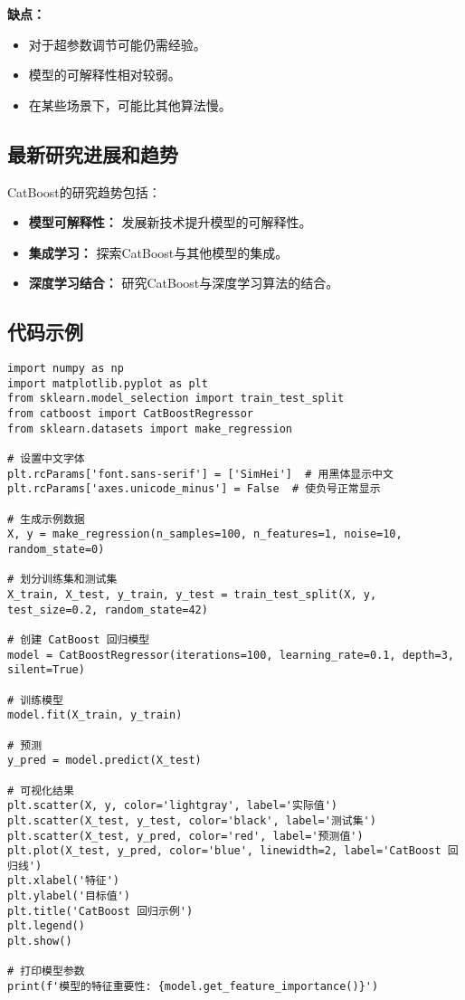 \textbf{缺点：}
\begin{itemize}
    \item 对于超参数调节可能仍需经验。
    \item 模型的可解释性相对较弱。
    \item 在某些场景下，可能比其他算法慢。
\end{itemize}

\subsection*{最新研究进展和趋势}
CatBoost的研究趋势包括：
\begin{itemize}
    \item \textbf{模型可解释性：} 发展新技术提升模型的可解释性。
    \item \textbf{集成学习：} 探索CatBoost与其他模型的集成。
    \item \textbf{深度学习结合：} 研究CatBoost与深度学习算法的结合。
\end{itemize}
\subsection*{代码示例}
\begin{lstlisting}
import numpy as np
import matplotlib.pyplot as plt
from sklearn.model_selection import train_test_split
from catboost import CatBoostRegressor
from sklearn.datasets import make_regression

# 设置中文字体
plt.rcParams['font.sans-serif'] = ['SimHei']  # 用黑体显示中文
plt.rcParams['axes.unicode_minus'] = False  # 使负号正常显示

# 生成示例数据
X, y = make_regression(n_samples=100, n_features=1, noise=10, random_state=0)

# 划分训练集和测试集
X_train, X_test, y_train, y_test = train_test_split(X, y, test_size=0.2, random_state=42)

# 创建 CatBoost 回归模型
model = CatBoostRegressor(iterations=100, learning_rate=0.1, depth=3, silent=True)

# 训练模型
model.fit(X_train, y_train)

# 预测
y_pred = model.predict(X_test)

# 可视化结果
plt.scatter(X, y, color='lightgray', label='实际值')
plt.scatter(X_test, y_test, color='black', label='测试集')
plt.scatter(X_test, y_pred, color='red', label='预测值')
plt.plot(X_test, y_pred, color='blue', linewidth=2, label='CatBoost 回归线')
plt.xlabel('特征')
plt.ylabel('目标值')
plt.title('CatBoost 回归示例')
plt.legend()
plt.show()

# 打印模型参数
print(f'模型的特征重要性: {model.get_feature_importance()}')

\end{lstlisting}



